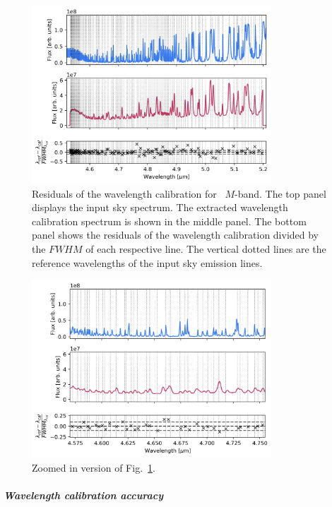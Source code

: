 \begin{figure}[!h]
  \centering
  \includegraphics[width=0.8\textwidth]{figures/LSS_CrtAlg_files/Residuals_m.png}
  \caption{Residuals of the wavelength calibration for \lss~$M$-band. The top panel displays the input sky spectrum. The extracted wavelength calibration spectrum is shown in the middle panel. The bottom panel shows the residuals of the wavelength calibration divided by the $FWHM$ of each respective line. The vertical dotted lines are the reference wavelengths of the input sky emission lines. }
  \label{fig:r_m}
\end{figure}

\begin{figure}[!h]
  \centering
  \includegraphics[width=0.8\textwidth]{figures/LSS_CrtAlg_files/Residuals_m_z.png}
  \caption{Zoomed in version of Fig.~\ref{fig:r_m}.
  }
  \label{fig:r_m_z}
\end{figure}

\subparagraph{Wavelength calibration accuracy}\label{sec:critalg_wavecal_acc}

